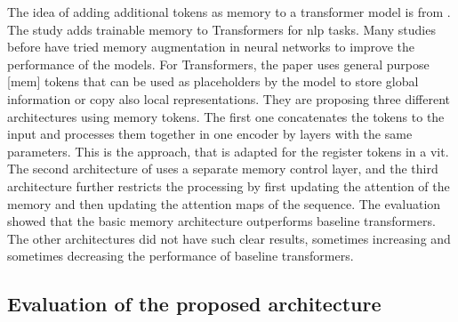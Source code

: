 \documentclass[conference]{IEEEtran}
\begin{document}
  The idea of adding additional tokens as memory to a transformer model is from \citeauthor{memorytransformer} \cite{memorytransformer}. The study adds trainable memory to Transformers for \ac{nlp} tasks. Many studies before have tried memory augmentation in neural networks to improve the performance of the models. For Transformers, the paper uses general purpose [mem] tokens that can be used as placeholders by the model to store global information or copy also local representations. They are proposing three different architectures using memory tokens. The first one concatenates the tokens to the input and processes them together in one encoder by layers with the same parameters. This is the approach, that is adapted for the register tokens in a \ac{vit}. The second architecture of \citeauthor{memorytransformer} \cite{memorytransformer} uses a separate memory control layer, and the third architecture further restricts the processing by first updating the attention of the memory and then updating the attention maps of the sequence. The evaluation showed that the basic memory architecture outperforms baseline transformers. The other architectures did not have such clear results, sometimes increasing and sometimes decreasing the performance of baseline transformers.

  \subsection{Evaluation of the proposed architecture}
  \label{sec:registers:evaluation}
\end{document}
